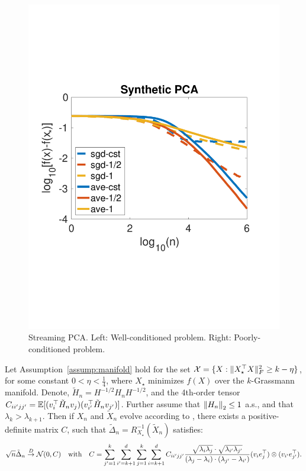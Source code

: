 \begin{figure}[!t]
\begin{minipage}[c]{.45\linewidth}
\includegraphics[width=\linewidth]{Figs/gappetit}
   \end{minipage}
   \vspace{-2.25cm}
  \caption{Streaming PCA. Left: Well-conditioned problem. Right: Poorly-conditioned problem.}
     \label{fig:synthetic}
  \vspace{-0.2cm}
\end{figure}
\begin{theorem} \label{thm:oja_main}
  Let Assumption~\ref{assump:manifold} hold for the set $\mathcal{X} = \{ X : \Vert X_\star^\top X\Vert_F^2 \geq k-\eta \}$, for some constant $0 < \eta <\frac{1}{4}$, where $X_\star$ minimizes $f(X)$ over the $k$-Grassmann manifold. Denote, $\tilde{H}_n =  H^{-1/2} H_n H^{-1/2}$, and the 4th-order tensor $C_{ii'jj'} = \mathbb{E} [(v_i^\top \tilde H_n v_j) (v_{i'}^\top \tilde H_n v_{j'})]$. Further assume that $\norm{H_n}_2 \leq 1$ a.s., and that $\lambda_k > \lambda_{k+1}$. Then if $X_n$ and $\tilde{X}_n$ evolve according to , there exists a positive-definite matrix $C$, such that $\tilde{\Delta}_n = R_{X_{\star}}^{-1}(\tilde{X}_n)$ satisfies:
  \vspace*{-6pt}
  \begin{align}
   \sqrt{n} \tilde{\Delta}_n \overset{D}{\to}  \mathcal{N}(0, C) \ \ \text{ with } \ \     C = \sum_{j'=1}^k\sum_{i'=k+1}^d \sum_{j=1}^k\sum_{i=k+1}^d C_{ii'jj'} \frac{\sqrt{\lambda_i \lambda_j} \cdot \sqrt{\lambda_{i'} \lambda_{j'}}}{(\lambda_{j}-\lambda_{i}) \cdot (\lambda_{j'}-\lambda_{i'})} (v_i e_j^\top) \otimes (v_{i'} e_{j'}^\top). \notag
  \end{align}
\end{theorem}
